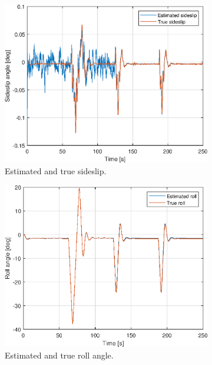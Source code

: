 \begin{figure}[ht]
\begin{subfigure}[b]{0.45\textwidth}
		\includegraphics[width=\textwidth]{figures/3g/beta_sideslip.eps}
		\caption{Estimated and true sideslip. }
		\label{fig:3g_beta_sideslip}
	\end{subfigure}
	\begin{subfigure}[b]{0.45\textwidth}
		\includegraphics[width=\textwidth]{figures/3g/roll_phi.eps}
		\caption{Estimated and true roll angle. }
		\label{fig:3g_roll_angle}
    \end{subfigure}	
    \begin{subfigure}[b]{0.45\textwidth}

\end{subfigure}
\end{figure}

